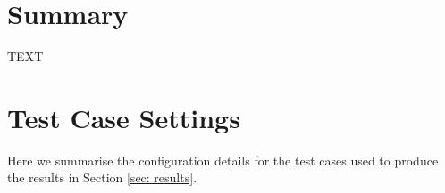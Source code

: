 \documentclass[journal abbreviation, manuscript]{copernicus}
\begin{document}
\section{Summary}
\label{sec: summary}


\conclusions  %
TEXT












\appendix
\section{Test Case Settings}  \label{sec:appendix}  %
Here we summarise the configuration details for the test cases used to produce the results in Section \ref{sec: results}.
\end{document}
